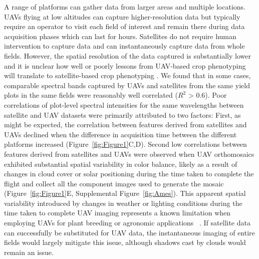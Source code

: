 \documentclass[12pt,twoside]{gsag3jnl}
\begin{document}

A range of platforms can gather data from larger areas and multiple locations. UAVs flying at low altitudes can capture higher-resolution data but typically require an operator to visit each field of interest and remain there during data acquisition phases which can last for hours. Satellites do not require human intervention to capture data and can instantaneously capture data from whole fields. However, the spatial resolution of the data captured is substantially lower and it is unclear how well or poorly lessons from UAV-based crop phenotyping will translate to satellite-based crop phenotyping \citep{sankaran2019unmanned,sankaran2020investigating,sankaran2021can}. We found that in some cases, comparable spectral bands captured by UAVs and satellites from the same yield plots in the same fields were reasonably well correlated ($R^2$ > 0.6). Poor correlations of plot-level spectral intensities for the same wavelengths between satellite and UAV datasets were primarily attributed to two factors: First, as might be expected, the correlation between features derived from satellites and UAVs declined when the difference in acquisition time between the different platforms increased (Figure~\ref{fig:Figure1}C,D). Second low correlations between features derived from satellites and UAVs were observed when UAV orthomosaics exhibited substantial spatial variability in color balance, likely as a result of changes in cloud cover or solar positioning during the time taken to complete the flight and collect all the component images used to generate the mosaic (Figure~\ref{fig:Figure1}E, Supplemental Figure~\ref{fig:Ames}). This apparent spatial variability introduced by changes in weather or lighting conditions during the time taken to complete UAV imaging represents a known limitation when employing UAVs for plant breeding or agronomic applications ~\citep{oliveira2018failure}. If satellite data can successfully be substituted for UAV data, the instantaneous imaging of entire fields would largely mitigate this issue, although shadows cast by clouds would remain an issue. 
\end{document}
